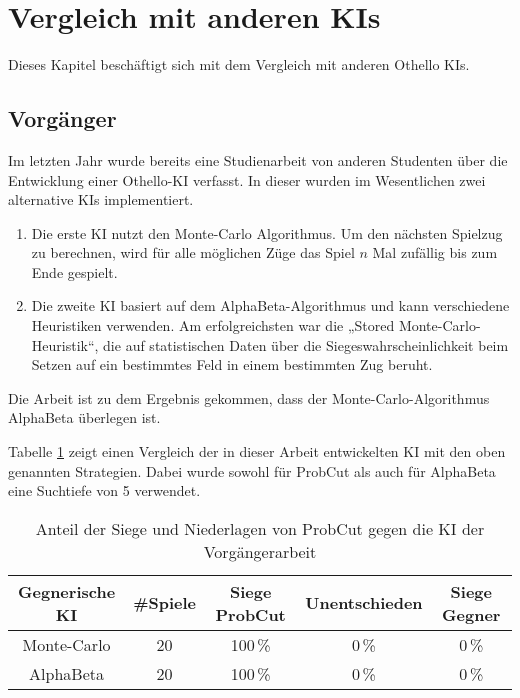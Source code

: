 
\section{Vergleich mit anderen KIs}
Dieses Kapitel beschäftigt sich mit dem Vergleich mit anderen Othello KIs.

\subsection{Vorgänger}
Im letzten Jahr wurde bereits eine Studienarbeit von anderen Studenten über die Entwicklung einer Othello-KI verfasst.
In dieser wurden im Wesentlichen zwei alternative KIs implementiert.
\begin{enumerate}
    \item Die erste KI nutzt den Monte-Carlo Algorithmus. Um den nächsten Spielzug zu berechnen, wird für alle möglichen
    Züge das Spiel $n$ Mal zufällig bis zum Ende gespielt.
    \cite[S.~19]{othellustudienarbeit}
    \item Die zweite KI basiert auf dem AlphaBeta-Algorithmus und kann verschiedene Heuristiken verwenden. Am
    erfolgreichsten war die „Stored Monte-Carlo-Heuristik“, die auf statistischen Daten über die
    Siegeswahrscheinlichkeit beim Setzen auf ein bestimmtes Feld in einem bestimmten Zug beruht.
    \cite[S.~30]{othellustudienarbeit}
\end{enumerate}
Die Arbeit ist zu dem Ergebnis gekommen, dass der Monte-Carlo-Algorithmus AlphaBeta überlegen ist.
\cite[S.~55]{othellustudienarbeit}

Tabelle \ref{table:comp:previous} zeigt einen Vergleich der in dieser Arbeit entwickelten KI mit den oben genannten Strategien. Dabei wurde sowohl für ProbCut als auch für AlphaBeta eine Suchtiefe von 5 verwendet.

\begin{table}[hb]
\centering
\begin{tabular}{c|c|ccc}
\hline
Gegnerische KI & \#Spiele & Siege ProbCut & Unentschieden & Siege Gegner \\
\hline
 Monte-Carlo & 20 & 100\,\% &   0\,\% &  0\,\% \\
 AlphaBeta   & 20 & 100\,\% &   0\,\% &  0\,\% \\
\hline
\end{tabular}
\caption{Anteil der Siege und Niederlagen von ProbCut gegen die KI der Vorgängerarbeit}
\label{table:comp:previous}
\end{table}
